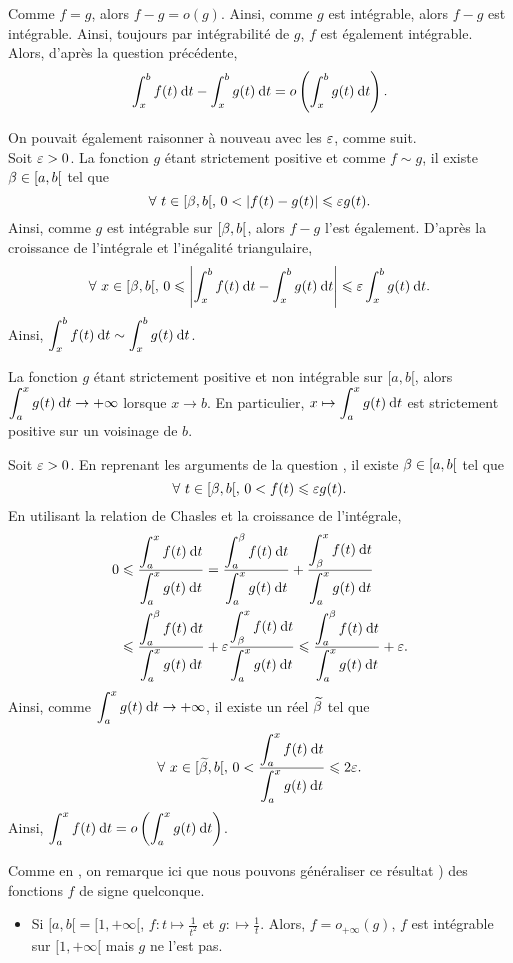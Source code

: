 \documentclass[oneside,11pt]{book}
\begin{document}
\begin{solution*}
\squ Comme $f = g$, alors $f - g = o(g)$. Ainsi, comme $g$ est intégrable, alors $f - g$ est intégrable. Ainsi, toujours par intégrabilité de $g$, $f$ est également intégrable. Alors, d'après la question précédente,
\[
\displaystyle \int_x^b f(t) \:{\text d}t - \displaystyle \int_x^b g(t) \:{\text d}t = o\left(\displaystyle \int_x^b g(t) \:{\text d}t\right).
\]

 On pouvait également raisonner à nouveau avec les $\varepsilon$, comme suit.\\
Soit $\varepsilon > 0$. La fonction $g$ étant strictement positive et comme $f \sim g$, il existe $\beta \in [a, b[$ tel que
\[
\forall~ t \in [\beta, b[,\, 0 < \left\lvert f(t) - g(t)\right\rvert \leqslant \varepsilon g(t).
\]
Ainsi, comme $g$ est intégrable sur $[\beta, b[$, alors $f - g$ l'est également. D'après la croissance de l'intégrale et l'inégalité triangulaire,
\[
\forall~ x \in [\beta, b[,\, 0 \leqslant \left\lvert\displaystyle \int_x^b f(t) \:{\text d}t - \displaystyle \int_x^b g(t) \:{\text d}t\right\rvert \leqslant \varepsilon \displaystyle \int_x^b g(t) \:{\text d}t.
\]
Ainsi, $\displaystyle \int_x^b f(t) \:{\text d}t \sim \displaystyle \int_x^b g(t) \:{\text d}t$.

\qu La fonction $g$ étant strictement positive et non intégrable sur $[a, b[$, alors $\displaystyle \int_a^x g(t) \:{\text d}t \to +\infty$ lorsque $x \to b$. En particulier, $x \mapsto \displaystyle \int_a^x g(t) \:{\text d}t$ est strictement positive sur un voisinage de $b$.

\squ Soit $\varepsilon > 0$. En reprenant les arguments de la question , il existe $\beta \in [a, b[$ tel que
\[
\forall~ t \in [\beta, b[,\, 0 < f(t) \leqslant \varepsilon g(t).
\]
En utilisant la relation de Chasles et la croissance de l'intégrale,
\begin{align*}
0 &\leqslant \frac{\displaystyle \int_a^x f(t) \:{\text d}t}{\displaystyle \int_a^x g(t) \:{\text d}t} = \frac{\displaystyle \int_a^\beta f(t) \:{\text d}t}{\displaystyle \int_a^x g(t) \:{\text d}t} + \frac{\displaystyle \int_\beta^x f(t) \:{\text d}t}{\displaystyle \int_a^x g(t) \:{\text d}t}\\
&\leqslant \frac{\displaystyle \int_a^\beta f(t) \:{\text d}t}{\displaystyle \int_a^x g(t) \:{\text d}t} + \varepsilon \frac{\displaystyle \int_\beta^x f(t) \:{\text d}t}{\displaystyle \int_a^x g(t) \:{\text d}t} \leqslant \frac{\displaystyle \int_a^\beta f(t) \:{\text d}t}{\displaystyle \int_a^x g(t) \:{\text d}t} + \varepsilon.
\end{align*}
Ainsi, comme $\displaystyle \int_a^x g(t) \:{\text d}t \to + \infty$, il existe un réel $\widetilde{\beta}$ tel que
\[
\forall~ x \in [\widetilde{\beta},b[,\, 0 < \frac{\displaystyle \int_a^x f(t) \:{\text d}t}{\displaystyle \int_a^x g(t) \:{\text d}t} \leqslant 2 \varepsilon.
\]
Ainsi, $\displaystyle \int_a^x f(t) \:{\text d}t = o\left(\displaystyle \int_a^x g(t) \:{\text d}t\right)$.

 Comme en , on remarque ici que nous pouvons généraliser ce résultat ) des fonctions $f$ de signe quelconque.

\begin{itemize}
\item Si $[a, b[ = [1, +\infty[$, $f : t \mapsto \frac{1}{t^2}$ et $g : \mapsto \frac{1}{t}$. Alors, $f = o_{+\infty}(g)$, $f$ est intégrable sur $[1, +\infty[$ mais $g$ ne l'est pas.


\end{itemize}
\end{solution*}
\end{document}
